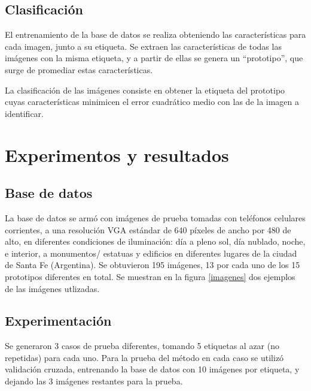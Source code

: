 \documentclass[conference,a4paper,10pt,oneside,final]{tfmpd}
\begin{document}
\subsection{Clasificación}
El entrenamiento de la base de datos se realiza obteniendo las características
para cada imagen, junto a su etiqueta.
Se extraen las características de todas las imágenes
con la misma etiqueta, y a partir de ellas se genera un
``prototipo'', que surge de promediar estas características.

La clasificación de las imágenes consiste en
obtener la etiqueta del prototipo cuyas características
minimicen el error cuadrático medio con las de
la imagen a identificar.
%
%
%
%
\section{Experimentos y resultados}
%
%
\subsection{Base de datos}
La base de datos se armó con imágenes de prueba tomadas con teléfonos celulares
corrientes, a una resolución VGA estándar de 640 píxeles de ancho por 480 de
alto, en diferentes condiciones
de iluminación: día a pleno sol, día nublado, noche, e interior, a monumentos/%
estatuas y edificios en diferentes lugares de la ciudad de Santa Fe (Argentina).
{Se obtuvieron 195 imágenes, 13 por cada uno de los 15 prototipos diferentes en
total.}
Se muestran en la figura \ref{imagenes} dos ejemplos de las imágenes utlizadas.


%
%
\subsection{Experimentación}
Se generaron 3 {casos} de prueba diferentes, tomando
5 etiquetas al azar (no repetidas) para cada {uno}.
Para la prueba del método {en cada caso}
se utilizó validación cruzada,
entrenando la base de datos con 10 imágenes por etiqueta, y dejando las 3
imágenes restantes para la prueba.
\end{document}
